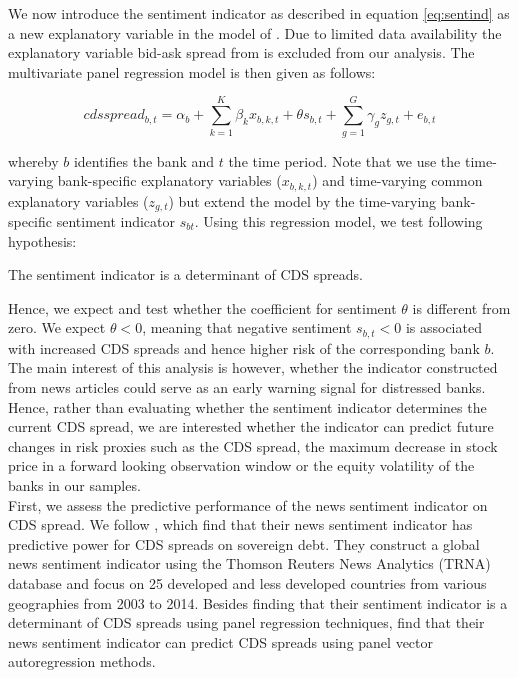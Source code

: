 We now introduce the sentiment indicator as described in equation \ref{eq:sentind} as a new explanatory variable in the model of \cite{annaert2013}. Due to limited data availability the explanatory variable bid-ask spread from \cite{annaert2013} is excluded from our analysis. The multivariate panel regression model is then given as follows:

\begin{equation}
	cdsspread_{b,t} = \alpha_b + \sum_{k=1}^K\beta_{k}x_{b,k,t} + \theta s_{b,t} + \sum_{g=1}^G\gamma_gz_{g,t}+e_{b,t}
\end{equation}

whereby $b$ identifies the bank and $t$ the time period. Note that we use the time-varying bank-specific explanatory variables ($x_{b,k,t}$) and time-varying common explanatory variables ($z_{g,t}$) but extend the model by the time-varying bank-specific sentiment indicator $s_{bt}$. Using this regression model, we test following hypothesis:

\begin{hyp}
	The sentiment indicator is a determinant of CDS spreads.
\end{hyp}

Hence, we expect and test whether the coefficient for sentiment $\theta$ is different from zero. We expect $\theta<0$, meaning that negative sentiment $s_{b,t}<0$ is associated with increased CDS spreads and hence higher risk of the corresponding bank $b$. \\

The main interest of this analysis is however, whether the indicator constructed from news articles could serve as an early warning signal for distressed banks. Hence, rather than evaluating whether the sentiment indicator determines the current CDS spread, we are interested whether the indicator can predict future changes in risk proxies such as the CDS spread, the maximum decrease in stock price in a forward looking observation window or the equity volatility of the banks in our samples. \\

First, we assess the predictive performance of the news sentiment indicator on CDS spread. We follow \cite{cathcart2020}, which find that their news sentiment indicator has predictive power for CDS spreads on sovereign debt. They construct a global news sentiment indicator using the Thomson Reuters News Analytics (TRNA) database and focus on 25 developed and less developed countries from various geographies from 2003 to 2014. Besides finding that their sentiment indicator is a determinant of CDS spreads using panel regression techniques, \cite{cathcart2020} find that their news sentiment indicator can predict CDS spreads using panel vector autoregression methods. \\

